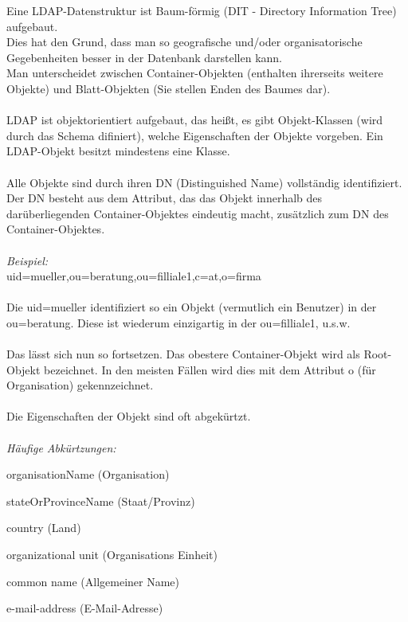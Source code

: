 Eine LDAP-Datenstruktur ist Baum-förmig (DIT - Directory Information Tree) aufgebaut.\\
Dies hat den Grund, dass man so geografische und/oder organisatorische Gegebenheiten besser in der Datenbank darstellen kann.
\\
Man unterscheidet zwischen Container-Objekten (enthalten ihrerseits weitere Objekte) und Blatt-Objekten (Sie stellen Enden des Baumes dar).\\
\\
LDAP ist objektorientiert aufgebaut, das heißt, es gibt Objekt-Klassen (wird durch das Schema difiniert), welche Eigenschaften der Objekte vorgeben. Ein LDAP-Objekt besitzt mindestens eine Klasse.\\
\\
Alle Objekte sind durch ihren DN (Distinguished Name) vollständig identifiziert. 
Der DN besteht aus dem Attribut, das das Objekt innerhalb des darüberliegenden Container-Objektes eindeutig macht, zusätzlich zum DN des Container-Objektes.\\
\\
\textit{Beispiel: }\\
uid=mueller,ou=beratung,ou=filliale1,c=at,o=firma\\
\\
Die uid=mueller identifiziert so ein Objekt (vermutlich ein Benutzer) in der ou=beratung. Diese ist wiederum einzigartig in der ou=filliale1, u.s.w.\\
\\
Das lässt sich nun so fortsetzen. Das obestere Container-Objekt wird als Root-Objekt bezeichnet. In den meisten Fällen wird dies mit dem Attribut o (für Organisation) gekennzeichnet.\\
\\
Die Eigenschaften der Objekt sind oft abgekürtzt.\\
\\
\textit{Häufige Abkürtzungen:}\\
\begin{description}[style=nextline]
	\item[o]
		organisationName (Organisation)
	\item[st]
		stateOrProvinceName (Staat/Provinz)
	\item[c]
		country (Land)
	\item[ou]
		organizational unit (Organisations Einheit)
	\item[cn]
		common name (Allgemeiner Name)
	\item[mail]
		e-mail-address (E-Mail-Adresse)
\end{description}

